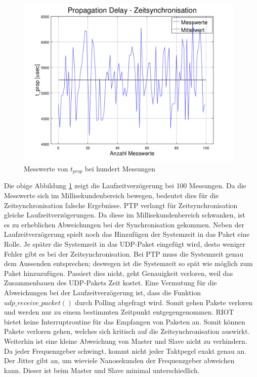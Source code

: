 \begin{figure}[H]
        \centering
        \hspace*{-1.7cm}
        \includegraphics[width=1.2\textwidth]{images/t_prop_zeit_sync_figure.png}
        \caption{Messwerte von $t_{prop}$ bei hundert Messungen}
        \label{img:zeit_sync_t_prop_figure}
\end{figure}

Die obige Abbildung \ref{img:zeit_sync_t_prop_figure} zeigt die Laufzeitverzögerung bei \si{100} Messungen. Da die Messwerte sich im Millisekundenbereich bewegen, bedeutet dies für die Zeitsynchronisation falsche Ergebnisse. PTP verlangt für Zeitsynchronisation gleiche Laufzeitverzögerungen. Da diese im Millisekundenbereich schwanken, ist es zu erheblichen Abweichungen bei der Synchronisation gekommen. Neben der Laufzeitverzögerung spielt noch das Hinzufügen der Systemzeit in das Paket eine Rolle. Je später die Systemzeit in das UDP-Paket eingefügt wird, desto weniger Fehler gibt es bei der Zeitsynchronisation. Bei PTP muss die Systemzeit genau dem Aussenden entsprechen; deswegen ist die Systemzeit so spät wie möglich zum Paket hinzuzufügen. Passiert dies nicht, geht Genauigkeit verloren, weil das Zusammenbauen des UDP-Pakets Zeit kostet. Eine Vermutung für die Abweichungen bei der Laufzeitverzögerung ist, dass die Funktion $udp\_receive\_packet()$ durch Polling abgefragt wird. Somit gehen Pakete verloren und werden nur zu einem bestimmten Zeitpunkt entgegengenommen. RIOT bietet keine Interruptroutine für das Empfangen von Paketen an. Somit können Pakete verloren gehen, welches sich kritisch auf die Zeitsynchronisation auswirkt. Weiterhin ist eine kleine Abweichung von Master und Slave nicht zu verhindern. Da jeder Frequenzgeber schwingt, kommt nicht jeder Taktpegel exakt genau an. Der Jitter gibt an, um wieviele Nanosekunden der Frequenzgeber abweichen kann. Dieser ist beim Master und Slave minimal unterschiedlich.

